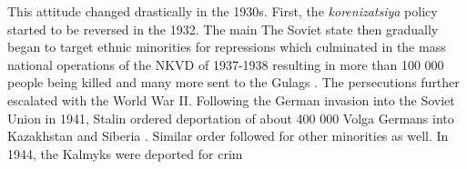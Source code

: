This attitude changed drastically in the 1930s.
First, the  \emph{korenizatsiya} policy started to be reversed in the 1932.
The main
The Soviet state then gradually  began to target ethnic minorities for repressions  which culminated in the mass national operations of the NKVD of 1937-1938 resulting in more than 100 000 people being killed and many more sent to the Gulags \citep{martin_origins_1998, gregory_terror_2009, snyder_bloodlands:_2011}. 
The persecutions  further escalated with the World War II. Following the German invasion into the Soviet Union in 1941, Stalin ordered deportation of about 400 000 Volga Germans into Kazakhstan and Siberia \citep{polian_against_2003}. Similar order followed for other minorities as well. In 1944, the Kalmyks were deported for crim